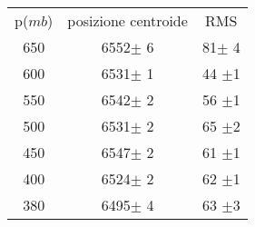 \begin{center}
\begin{tabulary}{\textwidth}{CCC}
\toprule
p($mb$) &  posizione centroide & RMS \\ 
650 & 6552$\pm$ 6 & 81$\pm$ 4 \\
600 & 6531$\pm$ 1 & 44 $\pm$1 \\
550 & 6542$\pm$ 2 & 56 $\pm$1 \\
500 & 6531$\pm$ 2 & 65 $\pm$2 \\
450 & 6547$\pm$ 2 & 61 $\pm$1 \\
400 & 6524$\pm$ 2 & 62 $\pm$1 \\
380 & 6495$\pm$ 4 & 63 $\pm$3 \\


 \bottomrule
\end{tabulary}
\end{center}
